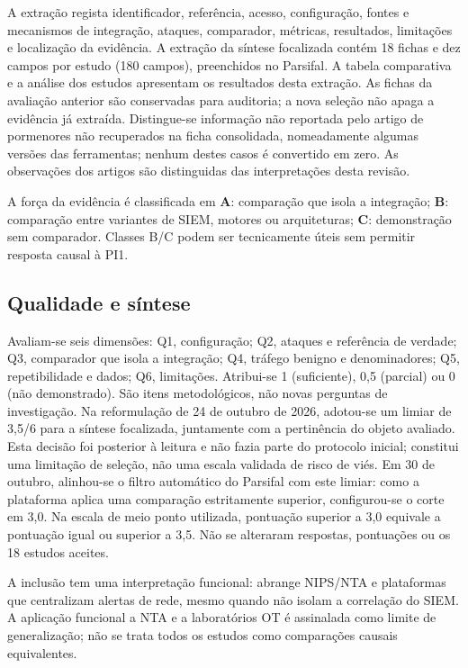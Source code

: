 \documentclass[11pt,a4paper]{article}
\begin{document}
A extração regista identificador, referência, acesso, configuração, fontes e mecanismos de integração, ataques, comparador, métricas, resultados, limitações e localização da evidência. A extração da síntese focalizada contém 18 fichas e dez campos por estudo (180 campos), preenchidos no Parsifal. A tabela comparativa e a análise dos estudos apresentam os resultados desta extração. As fichas da avaliação anterior são conservadas para auditoria; a nova seleção não apaga a evidência já extraída. Distingue-se informação não reportada pelo artigo de pormenores não recuperados na ficha consolidada, nomeadamente algumas versões das ferramentas; nenhum destes casos é convertido em zero. As observações dos artigos são distinguidas das interpretações desta revisão.

A força da evidência é classificada em \textbf{A}: comparação que isola a integração; \textbf{B}: comparação entre variantes de SIEM, motores ou arquiteturas; \textbf{C}: demonstração sem comparador. Classes B/C podem ser tecnicamente úteis sem permitir resposta causal à PI1.

\subsection{Qualidade e síntese}
Avaliam-se seis dimensões: Q1, configuração; Q2, ataques e referência de verdade; Q3, comparador que isola a integração; Q4, tráfego benigno e denominadores; Q5, repetibilidade e dados; Q6, limitações. Atribui-se 1 (suficiente), 0,5 (parcial) ou 0 (não demonstrado). São itens metodológicos, não novas perguntas de investigação. Na reformulação de 24 de outubro de 2026, adotou-se um limiar de 3,5/6 para a síntese focalizada, juntamente com a pertinência do objeto avaliado. Esta decisão foi posterior à leitura e não fazia parte do protocolo inicial; constitui uma limitação de seleção, não uma escala validada de risco de viés. Em 30 de outubro, alinhou-se o filtro automático do Parsifal com este limiar: como a plataforma aplica uma comparação estritamente superior, configurou-se o corte em 3,0. Na escala de meio ponto utilizada, pontuação superior a 3,0 equivale a pontuação igual ou superior a 3,5. Não se alteraram respostas, pontuações ou os 18 estudos aceites.

A inclusão tem uma interpretação funcional: abrange NIPS/NTA e plataformas que centralizam alertas de rede, mesmo quando não isolam a correlação do SIEM. A aplicação funcional a NTA e a laboratórios OT é assinalada como limite de generalização; não se trata todos os estudos como comparações causais equivalentes.
\end{document}
